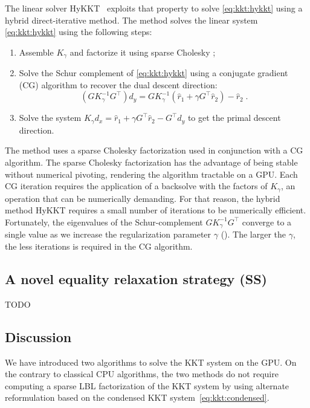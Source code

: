 The linear solver HyKKT~\cite{regev2023hykkt}
exploits that property to solve \eqref{eq:kkt:hykkt} using a hybrid
direct-iterative method. The method solves the linear system
\eqref{eq:kkt:hykkt} using the following steps:
\begin{enumerate}
  \item Assemble $K_\gamma$ and factorize it using sparse Cholesky ;
  \item Solve the Schur complement of \eqref{eq:kkt:hykkt} using a conjugate gradient (CG)
    algorithm to recover the dual descent direction:
    \begin{equation}
      \label{eq:kkt:schurcomplhykkt}
      (G K_\gamma^{-1} G^\top) d_y = G K_\gamma^{-1} (\hat{r}_1 + \gamma G^\top \hat{r}_2) - \hat{r}_2 \; .
    \end{equation}
  \item Solve the system $K_\gamma d_x = \hat{r}_1 + \gamma G^\top \hat{r}_2 - G^\top d_y$
    to get the primal descent direction.
\end{enumerate}
The method uses a sparse Cholesky factorization used in conjunction with a CG algorithm.
The sparse Cholesky factorization has the advantage of being stable without
numerical pivoting, rendering the algorithm tractable on a GPU.
Each CG iteration requires the application of a backsolve with the
factors of $K_\gamma$, an operation that can be numerically demanding. For that reason, the
hybrid method HyKKT requires a small number of iterations to be numerically efficient.
Fortunately, the eigenvalues of the Schur-complement $G K_\gamma^{-1} G^\top$
converge to a single value as we increase the regularization parameter
$\gamma$ (\cite[Theorem 4]{regev2023hykkt}). The larger the $\gamma$, the less iterations is required in the CG algorithm.


\subsection{A novel equality relaxation strategy (SS)}
\label{sec:kkt:sckkt}

TODO

\subsection{Discussion}
We have introduced two algorithms to solve
the KKT system on the GPU. On the contrary to classical CPU algorithms,
the two methods do not require computing a sparse LBL factorization of the KKT
system by using alternate reformulation based on the condensed KKT
system~\eqref{eq:kkt:condensed}.

